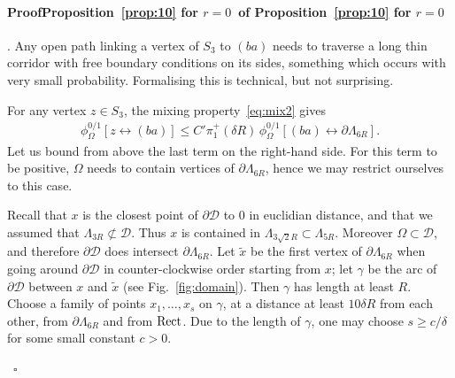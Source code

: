 \documentclass[a4paper,oneside,11pt]{article}
\numberwithin{equation}{section}
\numberwithin{equation}{section}
\numberwithin{equation}{section}
\newenvironment{proof}[1][\relax]%
  {\paragraph{Proof\ifx#1\relax\else~of #1\fi}}%
  {~\hfill$\square$\par\bigskip}
\newcommand{\calD}{\mathcal{D}}
\newcommand{\La}{\Lambda}
\begin{document}
\begin{proof}[Proposition~\ref{prop:10} for $r=0$]
.
Any open path linking a vertex of $S_3$ to $(ba)$ needs to traverse a long thin corridor with free boundary conditions on its sides, something which occurs with very small probability. Formalising this is technical, but not surprising. 

For any vertex $z \in S_3$, the mixing property~\eqref{eq:mix2} gives
\begin{align*}
	\phi^{0/1}_\Omega[z\longleftrightarrow (ba)]
	\le C' \pi_1^+(\delta R) \,\phi^{0/1}_\Omega[(ba)\longleftrightarrow\partial\Lambda_{6R}].
\end{align*} 
Let us bound from above the last term on the right-hand side. 
For this term to be positive, $\Omega$ needs to contain vertices of $\partial\Lambda_{6R}$, hence we may restrict ourselves to this case. 

Recall that $x$ is the closest point of $\partial \calD$ to $0$ in euclidian distance, and that we assumed that $\La_{3R} \nsubset\calD$.
Thus $x$ is contained in $\La_{3\sqrt2 R} \subset \La_{5R}$.
Moreover $\Omega \subset \calD$, and therefore $\partial\calD$ does intersect $\partial \La_{6R}$.
Let $\tilde x$ be the first vertex of $\partial \La_{6R}$ when going around $\partial \calD$ in counter-clockwise order starting from $x$;
let $\gamma$ be the arc of  $\partial \calD$ between $x$ and $\tilde x$ (see Fig.~\ref{fig:domain}).
Then $\gamma$ has length at least $R$.
Choose a family of points $x_1,\dots,x_s$ on $\gamma$, at a distance at least $10\delta R$ from each other, from $\partial \La_{6R}$ and from ${\rm Rect}$. Due to the length of $\gamma$, one may choose $s \geq c / \delta$ for some small constant $c > 0$. 


\end{proof}
\end{document}
